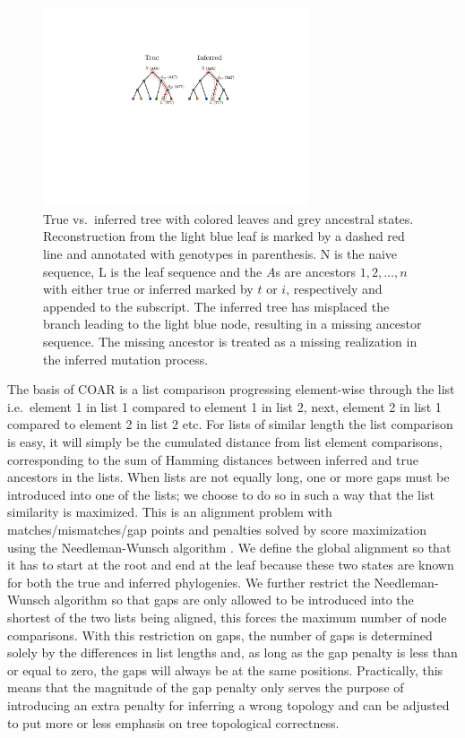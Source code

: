 \begin{figure}[ht!]
    \centering
    \includegraphics[width=0.7\textwidth]{figures/ASR_true_vs_inferred.pdf}
    \caption{
        \label{fig:ASR_true_vs_inferred}
        True vs.\ inferred tree with colored leaves and grey ancestral states. Reconstruction from the light blue leaf is marked by a dashed red line and annotated with genotypes in parenthesis.
        N is the naive sequence, L is the leaf sequence and the $A$s are ancestors $1, 2, \hdots, n$ with either true or inferred marked by $t$ or $i$, respectively and appended to the subscript.
        The inferred tree has misplaced the branch leading to the light blue node, resulting in a missing ancestor sequence.
        The missing ancestor is treated as a missing realization in the inferred mutation process.
    }
\end{figure}

\clearpage
The basis of COAR is a list comparison progressing element-wise through the list i.e.\ element 1 in list 1 compared to element 1 in list 2, next, element 2 in list 1 compared to element 2 in list 2 etc.
For lists of similar length the list comparison is easy, it will simply be the cumulated distance from list element comparisons, corresponding to the sum of Hamming distances between inferred and true ancestors in the lists.
When lists are not equally long, one or more gaps must be introduced into one of the lists; we choose to do so in such a way that the list similarity is maximized.
This is an alignment problem with matches/mismatches/gap points and penalties solved by score maximization using the Needleman-Wunsch algorithm \cite{needleman1970general}.
We define the global alignment so that it has to start at the root and end at the leaf because these two states are known for both the true and inferred phylogenies.
We further restrict the Needleman-Wunsch algorithm so that gaps are only allowed to be introduced into the shortest of the two lists being aligned, this forces the maximum number of node comparisons.
With this restriction on gaps, the number of gaps is determined solely by the differences in list lengths and, as long as the gap penalty is less than or equal to zero, the gaps will always be at the same positions.
Practically, this means that the magnitude of the gap penalty only serves the purpose of introducing an extra penalty for inferring a wrong topology and can be adjusted to put more or less emphasis on tree topological correctness.

